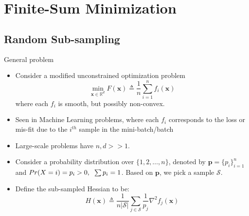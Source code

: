 \documentclass[10pt]{beamer}
\newcommand{\h}{\nabla^{2}}
\newcommand{\xbold}{\mathbf{x}}
\begin{document}
\section{Finite-Sum Minimization}
\subsection{Random Sub-sampling}
\begin{frame}{General problem}
\begin{itemize}
\item<1->{Consider a modified unconstrained optimization problem
  \begin{equation}
    \min_{\xbold \in \mathbb{R}^{d}} F(\xbold) \triangleq \frac{1}{n}\displaystyle \sum_{i=1}^{n} f_{i}(\xbold)
  \end{equation}
where each \(f_{i}\) is smooth, but possibly non-convex.}
\item<2->{Seen in Machine Learning problems, where each \(f_{i}\) corresponds to the loss or mis-fit due to the \(i^{th}\) sample in the mini-batch/batch}
\item<3->{Large-scale problems have \(n, d >> 1\).}
\item<4->{Consider a probability distribution over \(\{1, 2, \ldots, n\}\), denoted by \(\mathbf{p} = \{p_{i}\}_{i=1}^{n}\) and \(Pr(X = i) = p_{i} > 0, \hspace{2mm} \sum p_{i} = 1\). Based on \(\mathbf{p}\), we pick a sample \(\mathcal{S}\).}
\item<5->{Define the sub-sampled Hessian to be:
  \begin{equation}
    H(\xbold) \triangleq \frac{1}{n|\mathcal{S}|}\sum_{j \in \mathcal{S}} \frac{1}{p_{j}} \h f_{j}(\xbold)
  \end{equation}
}
\end{itemize}
\end{frame}
\end{document}
